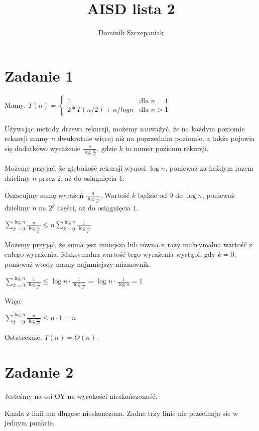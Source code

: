 \documentclass[12pt]{article}
\title{AISD lista 2}
\author{Dominik Szczepaniak}
\begin{document}
\maketitle

\bgroup\obeylines



\section{Zadanie 1}
Mamy:
$T(n) = \begin{cases}
    1 & \text{dla } n = 1\\
    2*T(n/2) + n / logn & \text{dla } n > 1
\end{cases}$


Używając metody drzewa rekursji, możemy zauważyć, że na każdym poziomie rekursji mamy $n$ dwukrotnie więcej niż na poprzednim poziomie, a także pojawia się dodatkowo wyrażenie $\frac{n}{\log\frac{n}{2^k}}$, gdzie $k$ to numer poziomu rekursji.

Możemy przyjąć, że głębokość rekursji wynosi $\log n$, ponieważ za każdym razem dzielimy $n$ przez $2$, aż do osiągnięcia $1$.

Oszacujmy sumę wyrażeń $\frac{n}{\log\frac{n}{2^k}}$. Wartość $k$ będzie od $0$ do $\log n$, ponieważ dzielimy $n$ na $2^k$ części, aż do osiągnięcia $1$.


$\sum_{k=0}^{\log n} \frac{n}{\log\frac{n}{2^k}} \leq n \sum_{k=0}^{\log n} \frac{1}{\log\frac{n}{2^k}}$


Możemy przyjąć, że suma jest mniejsza lub równa $n$ razy maksymalna wartość z całego wyrażenia. Maksymalna wartość tego wyrażenia wystąpi, gdy $k = 0$, ponieważ wtedy mamy najmniejszy mianownik.


$\sum_{k=0}^{\log n} \frac{1}{\log\frac{n}{2^k}} \leq \log n \cdot \frac{1}{\log\frac{n}{2^0}} = \log n \cdot \frac{1}{\log n} = 1$


Więc:


$\sum_{k=0}^{\log n} \frac{n}{\log\frac{n}{2^k}} \leq n \cdot 1 = n$

Ostatecznie, $T(n) = \Theta(n)$.



\section{Zadanie 2}
Jesteśmy na osi OY na wysokości nieskończoność.

Kazda z linii ma dlugosc nieskonczona.
Zadne trzy linie nie przecinaja sie w jednym punkcie. 
\end{document}
